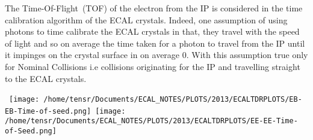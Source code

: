 The Time-Of-Flight~(TOF) of the electron from the IP is considered in the time calibration algorithm of the ECAL crystals.
Indeed, one assumption of using photons to time calibrate the ECAL crystals in that, they travel with the speed of light and so on average the time taken for a photon to travel from the IP until it impinges on the crystal surface in on average 0. With this assumption true only for Nominal Collisions i.e collisions originating for the IP and travelling straight to the ECAL crystals.
\newline


\begin{center}
\centering
\mbox{
\texttt{[image: /home/tensr/Documents/ECAL\_NOTES/PLOTS/2013/ECALTDRPLOTS/EB-EB-Time-of-seed.png]}\quad
\texttt{[image: /home/tensr/Documents/ECAL\_NOTES/PLOTS/2013/ECALTDRPLOTS/EE-EE-Time-of-Seed.png]}}
\label{fig:ZeeTimePerformance}
\end{center}



